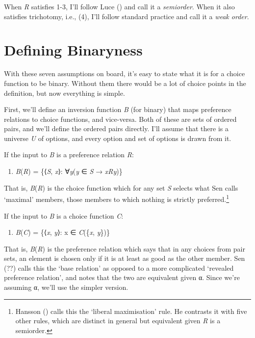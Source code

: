 \documentclass[
  11pt,
  letterpaper,
  DIV=11,
  numbers=noendperiod,
  twoside]{scrartcl}
\providecommand{\tightlist}{%
  \setlength{\itemsep}{0pt}\setlength{\parskip}{0pt}}
\begin{document}
When \emph{R} satisfies 1-3, I'll follow Luce
() and call it a \emph{semiorder}. When it
also satisfies trichotomy, i.e., (4), I'll follow standard practice and
call it a \emph{weak order}.

\section{Defining Binaryness}\label{sec-defining}

With these seven assumptions on board, it's easy to state what it is for
a choice function to be binary. Without them there would be a lot of
choice points in the definition, but now everything is simple.

First, we'll define an inversion function \emph{B} (for binary) that
maps preference relations to choice functions, and vice-versa. Both of
these are sets of ordered pairs, and we'll define the ordered pairs
directly. I'll assume that there is a universe \emph{U} of options, and
every option and set of options is drawn from it.

If the input to \emph{B} is a preference relation \emph{R}:

\begin{enumerate}
\def\labelenumi{(\arabic{enumi})}
\setcounter{enumi}{6}
\tightlist
\item
  \emph{B}(\emph{R}) = \{⟨\emph{S}, \emph{x}⟩: ∀\emph{y}(\emph{y} ∈
  \emph{S} → \emph{xRy})\}
\end{enumerate}

That is, \emph{B}(\emph{R}) is the choice function which for any set
\emph{S} selects what Sen calls `maximal' members, those members to
which nothing is strictly preferred.\footnote{Hansson
  () calls this the `liberal
  maximisation' rule. He contrasts it with five other rules, which are
  distinct in general but equivalent given \emph{R} is a semiorder.}

If the input to \emph{B} is a choice function \emph{C}:

\begin{enumerate}
\def\labelenumi{(\arabic{enumi})}
\setcounter{enumi}{7}
\tightlist
\item
  \emph{B}(\emph{C}) = \{⟨\emph{x}, \emph{y}⟩: x ∈ \emph{C}(\{\emph{x},
  \emph{y}\})\}
\end{enumerate}

That is, \emph{B}(\emph{R}) is the preference relation which says that
in any choices from pair sets, an element is chosen only if it is at
least as good as the other member. Sen
(??) calls this the `base
relation' as opposed to a more complicated `revealed preference
relation', and notes that the two are equivalent given α. Since we're
assuming α, we'll use the simpler version.
\end{document}
